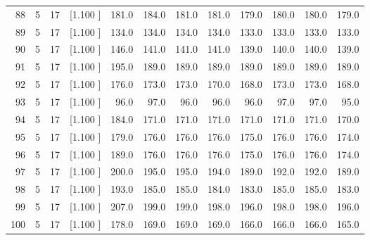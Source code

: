 \documentclass[12pt,a4paper]{article}
\begin{document}
\begin{center}
{\begin{tabular}{r r r r r r r r r r r r}
  88&  5& 17&[1.100     ]&   181.0&   184.0&   181.0&   181.0&   179.0&   180.0&   180.0&   179.0\\[-0.02in]
  89&  5& 17&[1.100     ]&   134.0&   134.0&   134.0&   134.0&   133.0&   133.0&   133.0&   133.0\\[-0.02in]
  90&  5& 17&[1.100     ]&   146.0&   141.0&   141.0&   141.0&   139.0&   140.0&   140.0&   139.0\\[-0.02in]
  91&  5& 17&[1.100     ]&   195.0&   189.0&   189.0&   189.0&   189.0&   189.0&   189.0&   189.0\\[-0.02in]
  92&  5& 17&[1.100     ]&   176.0&   173.0&   173.0&   170.0&   168.0&   173.0&   173.0&   168.0\\[-0.02in]
  93&  5& 17&[1.100     ]&    96.0&    97.0&    96.0&    96.0&    96.0&    97.0&    97.0&    95.0\\[-0.02in]
  94&  5& 17&[1.100     ]&   184.0&   171.0&   171.0&   171.0&   171.0&   171.0&   171.0&   170.0\\[-0.02in]
  95&  5& 17&[1.100     ]&   179.0&   176.0&   176.0&   176.0&   175.0&   176.0&   176.0&   174.0\\[-0.02in]
  96&  5& 17&[1.100     ]&   189.0&   176.0&   176.0&   176.0&   175.0&   176.0&   176.0&   174.0\\[-0.02in]
  97&  5& 17&[1.100     ]&   200.0&   195.0&   195.0&   194.0&   189.0&   192.0&   192.0&   189.0\\[-0.02in]
  98&  5& 17&[1.100     ]&   193.0&   185.0&   185.0&   184.0&   183.0&   185.0&   185.0&   183.0\\[-0.02in]
  99&  5& 17&[1.100     ]&   207.0&   199.0&   199.0&   198.0&   196.0&   198.0&   198.0&   196.0\\[-0.02in]
 100&  5& 17&[1.100     ]&   178.0&   169.0&   169.0&   169.0&   166.0&   166.0&   166.0&   165.0\\[-0.02in]

\hline
\end{tabular}}
\end{center}
\end{document}

